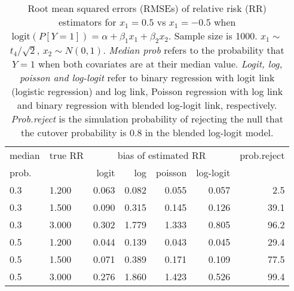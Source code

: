 \documentclass[12pt,a4paper]{article}
\begin{document}
\begin{table}[H] 
\small\sf\centering 
\caption{Root mean squared errors (RMSEs) of relative risk (RR) estimators for $x_1=0.5$ vs $x_1=-0.5$ when $\mbox{logit}(P[Y=1])=\alpha+\beta_1 x_1 + \beta_2 x_2$. Sample size is 1000. $x_1 \sim $$t_4/\sqrt{2}$, $x_2 \sim N(0,1)$. {\it Median prob} refers to the probability that $Y=1$ when both covariates are at their median value. {\it Logit, log, poisson and log-logit} refer to binary regression with logit link (logistic regression) and log link, Poisson regression with log link and binary regression with blended log-logit link, respectively. {\it Prob.reject} is the simulation probability of rejecting the null that the cutover probability is $0.8$ in the blended log-logit model.} 
\begin{tabular}{llrrrrr} 
\toprule 
median & true RR & \multicolumn{4}{c}{bias of estimated RR} & prob.reject \\ 
prob. & & logit & log & poisson & log-logit  & \\ \midrule 
0.3 & 1.200 & 0.063 & 0.082 & 0.055 & 0.057 &  2.5 \\  
0.3 & 1.500 & 0.090 & 0.315 & 0.145 & 0.126 & 39.1 \\  
0.3 & 3.000 & 0.302 & 1.779 & 1.333 & 0.805 & 96.2 \\  
0.5 & 1.200 & 0.044 & 0.139 & 0.043 & 0.045 & 29.4 \\  
0.5 & 1.500 & 0.071 & 0.389 & 0.171 & 0.109 & 77.5 \\  
0.5 & 3.000 & 0.276 & 1.860 & 1.423 & 0.526 & 99.4 \\  
\bottomrule 
\end{tabular} 
\end{table} 
\end{document}
